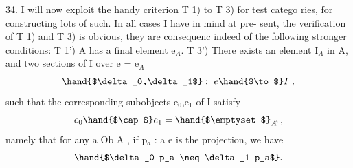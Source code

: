 \margin{$\downarrow$}34.    I will now exploit the handy criterion  T 1) to T 3) for test catego%
ries, for constructing lots of such.  In all cases I have in mind at pre-%
sent,  the verification of  T 1) and T 3) is obvious,  they are consequenc
indeed of the following stronger conditions:
T 1')  A has a final element e$_{A}$.
T 3')  There exists an element I$_{A}$ in A, and two sections  of I over
e = e$_{A}$
\[ \hand{$\delta_0,\delta_1$} :\ e \hand{$\to$} I \ , \]
such that the corresponding subobjects e$_0$,e$_1$ of I satisfy 
\[ e_0\hand{$\cap$}e_1 = \hand{$\emptyset$}_{A\hat{}} \ , \]
namely that for any a \hand{$\in$}Ob A , if p$_{a}$ : a \hand{$\to$}e is the projection, we
have
\[ \hand{$\delta_0 p_a \neq \delta_1 p_a$} . \]

